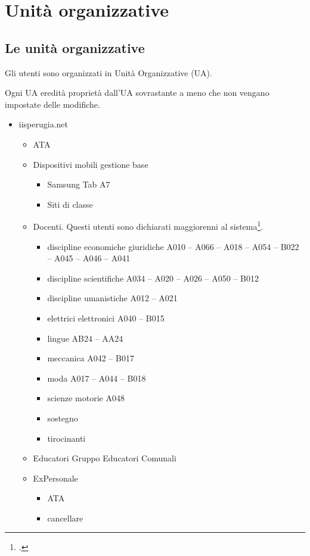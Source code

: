 \chapter{Unità organizzative}
\section{Le unità organizzative}
Gli utenti sono organizzati in Unità Organizzative (UA). 

Ogni UA eredità proprietà dall'UA sovrastante a meno che non vengano impostate delle modifiche.
\begin{itemize}
	\item iisperugia.net
	\begin{itemize}
		\item ATA
		\item Dispositivi mobili gestione base
		\begin{itemize}
			\item Samsung Tab A7
			\item Siti di classe
		\end{itemize}
	\item Docenti. Questi utenti sono dichiarati maggiorenni al sistema\footcite{Google2021b}.
	\begin{itemize}
		\item discipline economiche giuridiche A010 – A066 – A018 – A054 – B022 – A045 – A046 – A041
		\item discipline scientifiche
		A034 – A020 – A026 – A050 – B012
		\item discipline umanistiche
		A012 – A021
		\item elettrici elettronici
		A040 – B015
		\item lingue
		AB24 – AA24
		\item meccanica
		A042 – B017
		\item moda
		A017 – A044 – B018
		\item scienze motorie
		A048 
		\item sostegno
		\item tirocinanti
		\end{itemize}
\item  Educatori
Gruppo Educatori Comunali
\item ExPersonale
\begin{itemize}
	\item ATA
	\item cancellare

\end{itemize}
\end{itemize}
\end{itemize}
